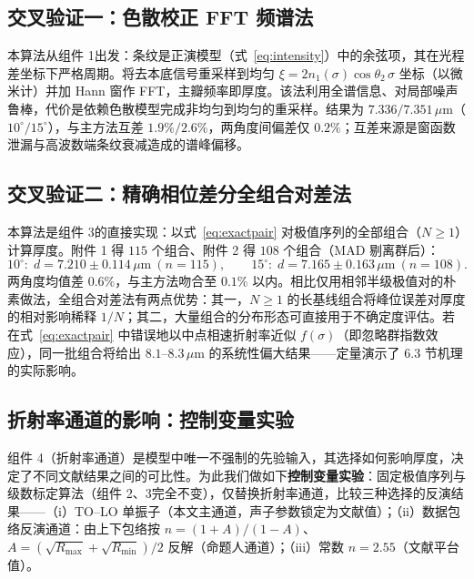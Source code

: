 \documentclass[11pt,a4paper,fontset=fandol]{ctexart}
\newcommand{\um}{\,\mu\mathrm{m}}
\begin{document}
\subsection{交叉验证一：色散校正 FFT 频谱法}

本算法从组件 1出发：条纹是正演模型（式~\eqref{eq:intensity}）中的余弦项，其在光程差坐标下严格周期。将去本底信号重采样到均匀 $\xi=2n_1(\sigma)\cos\theta_2\,\sigma$ 坐标（以微米计）并加 Hann 窗作 FFT，主瓣频率即厚度。该法利用全谱信息、对局部噪声鲁棒，代价是依赖色散模型完成非均匀到均匀的重采样。结果为 $7.336/7.351\um$（$10^\circ/15^\circ$），与主方法互差 $1.9\%/2.6\%$，两角度间偏差仅 $0.2\%$；互差来源是窗函数泄漏与高波数端条纹衰减造成的谱峰偏移。

\subsection{交叉验证二：精确相位差分全组合对差法}\label{sec:pairs}

本算法是组件 3的直接实现：以式~\eqref{eq:exactpair} 对极值序列的全部组合（$N\ge1$）计算厚度。附件 1 得 $115$ 个组合、附件 2 得 $108$ 个组合（MAD 剔离群后）：
\begin{equation}
    10^\circ:\; d=7.210\pm0.114\um\ (n=115),
    \qquad
    15^\circ:\; d=7.165\pm0.163\um\ (n=108).
    \label{eq:exactresult}
\end{equation}
两角度均值差 $0.6\%$，与主方法吻合至 $0.1\%$ 以内。相比仅用相邻半级极值对的朴素做法，全组合对差法有两点优势：其一，$N\ge1$ 的长基线组合将峰位误差对厚度的相对影响稀释 $1/N$；其二，大量组合的分布形态可直接用于不确定度评估。若在式~\eqref{eq:exactpair} 中错误地以中点相速折射率近似 $f(\sigma)$（即忽略群指数效应），同一批组合将给出 $8.1\text{--}8.3\um$ 的系统性偏大结果——定量演示了 6.3 节机理的实际影响。

\subsection{折射率通道的影响：控制变量实验}\label{sec:channel}

组件 4（折射率通道）是模型中唯一不强制的先验输入，其选择如何影响厚度，决定了不同文献结果之间的可比性。为此我们做如下\textbf{控制变量实验}：固定极值序列与级数标定算法（组件 2、3完全不变），仅替换折射率通道，比较三种选择的反演结果——（i）TO--LO 单振子（本文主通道，声子参数锁定为文献值）；（ii）数据包络反演通道：由上下包络按 $n=(1+A)/(1-A)$、$A=(\sqrt{R_{\max}}+\sqrt{R_{\min}})/2$ 反解（命题人通道\cite{xue2026}）；（iii）常数 $n=2.55$（文献平台值）。
\end{document}
